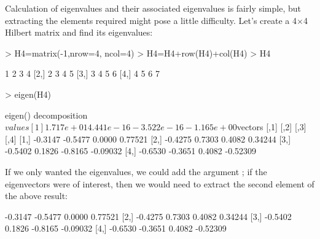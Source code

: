 Calculation of eigenvalues and their associated eigenvalues is fairly simple, but extracting the elements required might pose a little difficulty. 
 Let's create a 4$\times$4 Hilbert matrix and find its eigenvalues: 
\begin{Schunk}
\begin{Sinput}
> H4=matrix(-1,nrow=4, ncol=4) 
> H4=H4+row(H4)+col(H4) 
> H4 
\end{Sinput}
\begin{Soutput}
     [,1] [,2] [,3] [,4]
[1,]    1    2    3    4
[2,]    2    3    4    5
[3,]    3    4    5    6
[4,]    4    5    6    7
\end{Soutput}
\begin{Sinput}
> eigen(H4) 
\end{Sinput}
\begin{Soutput}
eigen() decomposition
$values
[1]  1.717e+01  4.441e-16 -3.522e-16 -1.165e+00

$vectors
        [,1]    [,2]    [,3]     [,4]
[1,] -0.3147 -0.5477  0.0000  0.77521
[2,] -0.4275  0.7303  0.4082  0.34244
[3,] -0.5402  0.1826 -0.8165 -0.09032
[4,] -0.6530 -0.3651  0.4082 -0.52309
\end{Soutput}
\end{Schunk}
If we only wanted the eigenvalues, we could add the argument ; if the eigenvectors were of interest, then we would need to extract the second element of the above result: 
\begin{Schunk}
\begin{Soutput}
        [,1]    [,2]    [,3]     [,4]
[1,] -0.3147 -0.5477  0.0000  0.77521
[2,] -0.4275  0.7303  0.4082  0.34244
[3,] -0.5402  0.1826 -0.8165 -0.09032
[4,] -0.6530 -0.3651  0.4082 -0.52309
\end{Soutput}
\end{Schunk}


